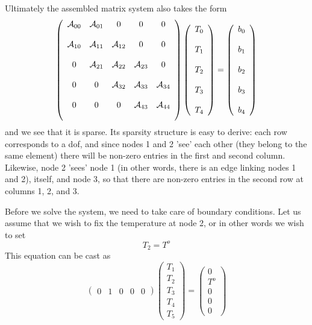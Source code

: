 Ultimately the assembled matrix system also takes the form
\[
\left(
\begin{array}{ccccc}
{\cal A}_{00} & {\cal A}_{01} & 0& 0& 0\\ \\
{\cal A}_{10} & {\cal A}_{11} & {\cal A}_{12}& 0 & 0\\\\
0 & {\cal A}_{21} & {\cal A}_{22}&  {\cal A}_{23}  & 0\\\\
0&0&   {\cal A}_{32} & {\cal A}_{33}&  {\cal A}_{34} \\\\
0&0&0   & {\cal A}_{43}&  {\cal A}_{44} \\\\
\end{array}
\right)
\left(
\begin{array}{c}
T_0 \\\\ T_1 \\\\ T_2 \\\\ T_3 \\\\ T_4
\end{array}
\right)
=
\left(
\begin{array}{c}
b_0\\\\
b_1\\\\
b_2\\\\
b_3\\\\
b_4
\end{array}
\right)
\]
and we see that it is sparse. Its sparsity structure is easy to derive: each row corresponds to a dof, 
and since nodes 1 and 2 'see' each other (they belong to the same element) there will be non-zero entries
in the first and second column. 
Likewise, node 2 'sees' node 1 (in other words, there is an edge linking nodes 1 and 2), itself, 
and node 3, so that there are non-zero entries in the second row at columns 1, 2, and 3.

Before we solve the system, we need to take care of boundary conditions.
Let us assume that we wish to fix the temperature at node 2, or in other words 
we wish to set 
\[
T_2 = T^{o}
\]
This equation can be cast as
\[
\left(
\begin{array}{ccccc}
 0 & 1 & 0 & 0 & 0
\end{array}
\right)
\left(
\begin{array}{c}
T_1 \\ T_2 \\ T_3 \\ T_4 \\ T_5
\end{array}
\right)
=
\left(
\begin{array}{c}
0 \\
T^{o} \\
0 \\
0 \\
0
\end{array}
\right)
\]

